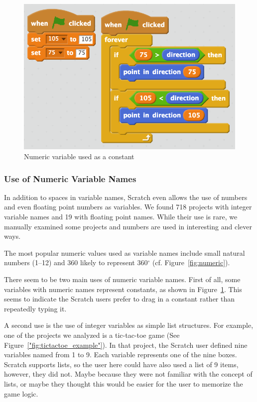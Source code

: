 \documentclass[conference]{IEEEtran}
\begin{document}
\begin{figure}[!b]
	\begin{center}
		\includegraphics[width=\columnwidth]{fig/constants}
		\caption{Numeric variable used as a constant}
		\label{fig:constants}
	\end{center}
\end{figure} 	

\subsubsection{Use of Numeric Variable Names}
In addition to spaces in variable names, Scratch even allows the use of numbers and even floating point numbers as variables. We found 718 projects with integer variable names and 19 with floating point names. While their use is rare, we manually examined some projects and numbers are used in interesting and clever ways. 

The most popular numeric values used as variable names include small natural numbers (1--12) and 360 likely to represent 360$^\circ$ (cf. Figure~\ref{fig:numeric}).

There seem to be two main uses of numeric variable names. First of all, some variables with numeric names represent constants, as shown in Figure~\ref{fig:constants}. This seems to indicate the Scratch users prefer to drag in a constant rather than repeatedly typing it.

A second use is the use of integer variables as simple list structures. For example, one of the projects we analyzed is a tic-tac-toe game (See Figure~\ref{"fig:tictactoe_example"}). In that project, the Scratch user defined nine variables named from 1 to 9. Each variable represents one of the nine boxes. Scratch supports lists, so the user here could have also used a list of 9 items, however, they did not. Maybe because they were not familiar with the concept of lists, or maybe they thought this would be easier for the user to memorize the game logic.  
\end{document}
